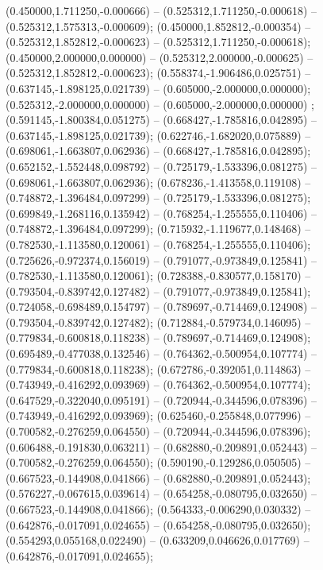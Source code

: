  (0.450000,1.711250,-0.000666) -- (0.525312,1.711250,-0.000618) -- (0.525312,1.575313,-0.000609);
 (0.450000,1.852812,-0.000354) -- (0.525312,1.852812,-0.000623) -- (0.525312,1.711250,-0.000618);
 (0.450000,2.000000,0.000000) -- (0.525312,2.000000,-0.000625) -- (0.525312,1.852812,-0.000623);
 (0.558374,-1.906486,0.025751) -- (0.637145,-1.898125,0.021739) -- (0.605000,-2.000000,0.000000);
 (0.525312,-2.000000,0.000000) -- (0.605000,-2.000000,0.000000) ;
 (0.591145,-1.800384,0.051275) -- (0.668427,-1.785816,0.042895) -- (0.637145,-1.898125,0.021739);
 (0.622746,-1.682020,0.075889) -- (0.698061,-1.663807,0.062936) -- (0.668427,-1.785816,0.042895);
 (0.652152,-1.552448,0.098792) -- (0.725179,-1.533396,0.081275) -- (0.698061,-1.663807,0.062936);
 (0.678236,-1.413558,0.119108) -- (0.748872,-1.396484,0.097299) -- (0.725179,-1.533396,0.081275);
 (0.699849,-1.268116,0.135942) -- (0.768254,-1.255555,0.110406) -- (0.748872,-1.396484,0.097299);
 (0.715932,-1.119677,0.148468) -- (0.782530,-1.113580,0.120061) -- (0.768254,-1.255555,0.110406);
 (0.725626,-0.972374,0.156019) -- (0.791077,-0.973849,0.125841) -- (0.782530,-1.113580,0.120061);
 (0.728388,-0.830577,0.158170) -- (0.793504,-0.839742,0.127482) -- (0.791077,-0.973849,0.125841);
 (0.724058,-0.698489,0.154797) -- (0.789697,-0.714469,0.124908) -- (0.793504,-0.839742,0.127482);
 (0.712884,-0.579734,0.146095) -- (0.779834,-0.600818,0.118238) -- (0.789697,-0.714469,0.124908);
 (0.695489,-0.477038,0.132546) -- (0.764362,-0.500954,0.107774) -- (0.779834,-0.600818,0.118238);
 (0.672786,-0.392051,0.114863) -- (0.743949,-0.416292,0.093969) -- (0.764362,-0.500954,0.107774);
 (0.647529,-0.322040,0.095191) -- (0.720944,-0.344596,0.078396) -- (0.743949,-0.416292,0.093969);
 (0.625460,-0.255848,0.077996) -- (0.700582,-0.276259,0.064550) -- (0.720944,-0.344596,0.078396);
 (0.606488,-0.191830,0.063211) -- (0.682880,-0.209891,0.052443) -- (0.700582,-0.276259,0.064550);
 (0.590190,-0.129286,0.050505) -- (0.667523,-0.144908,0.041866) -- (0.682880,-0.209891,0.052443);
 (0.576227,-0.067615,0.039614) -- (0.654258,-0.080795,0.032650) -- (0.667523,-0.144908,0.041866);
 (0.564333,-0.006290,0.030332) -- (0.642876,-0.017091,0.024655) -- (0.654258,-0.080795,0.032650);
 (0.554293,0.055168,0.022490) -- (0.633209,0.046626,0.017769) -- (0.642876,-0.017091,0.024655);
